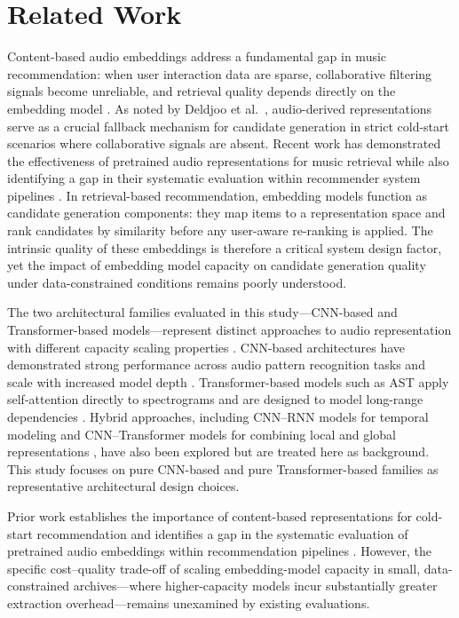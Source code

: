 \documentclass[sigconf]{acmart}
\begin{document}
\section{Related Work}\label{sec:related-work}

Content-based audio embeddings address a fundamental gap in music recommendation: when user interaction data are sparse, collaborative filtering signals become unreliable, and retrieval quality depends directly on the embedding model \cite{schedl2018}. As noted by Deldjoo et al.\ \cite{deldjoo2024}, audio-derived representations serve as a crucial fallback mechanism for candidate generation in strict cold-start scenarios where collaborative signals are absent. Recent work has demonstrated the effectiveness of pretrained audio representations for music retrieval while also identifying a gap in their systematic evaluation within recommender system pipelines \cite{tamm2024}. In retrieval-based recommendation, embedding models function as candidate generation components: they map items to a representation space and rank candidates by similarity before any user-aware re-ranking is applied. The intrinsic quality of these embeddings is therefore a critical system design factor, yet the impact of embedding model capacity on candidate generation quality under data-constrained conditions remains poorly understood.

The two architectural families evaluated in this study---CNN-based and Transformer-based models---represent distinct approaches to audio representation with different capacity scaling properties \cite{zaman2023}. CNN-based architectures have demonstrated strong performance across audio pattern recognition tasks and scale with increased model depth \cite{kong2020panns}. Transformer-based models such as AST apply self-attention directly to spectrograms and are designed to model long-range dependencies \cite{gong2021ast, zaman2023}. Hybrid approaches, including CNN--RNN models for temporal modeling \cite{lin2024} and CNN--Transformer models for combining local and global representations \cite{pourmoazemi2024}, have also been explored but are treated here as background. This study focuses on pure CNN-based and pure Transformer-based families as representative architectural design choices.

Prior work establishes the importance of content-based representations for cold-start recommendation \cite{schedl2018, deldjoo2024} and identifies a gap in the systematic evaluation of pretrained audio embeddings within recommendation pipelines \cite{tamm2024}. However, the specific cost--quality trade-off of scaling embedding-model capacity in small, data-constrained archives---where higher-capacity models incur substantially greater extraction overhead---remains unexamined by existing evaluations.
\end{document}
